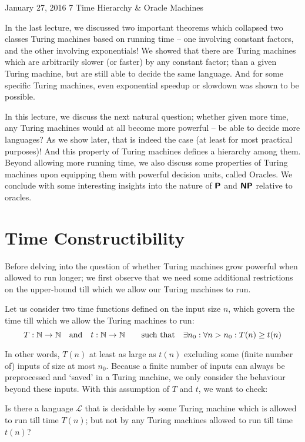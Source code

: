 \documentclass[usletter]{article}
\newcommand{\namedset}[1]
           {\ensuremath{\mathbb{#1}}}
\newcommand{\collection}[1]
           {\ensuremath{\mathcal{#1}}}
\newcommand{\family}[1]
           {\ensuremath{\textnormal{\textsf{\textbf{#1}}}}}
\newcommand{\term}[1]{\textsf{#1}}
\begin{document}
 {January 27, 2016}
            {7}
            {Time Hierarchy \& Oracle Machines}

\noindent
In the last lecture, we discussed two important theorems which
collapsed two classes Turing machines based on running time -- one involving
constant factors, and the other involving exponentials! We
showed that there are Turing machines which are arbitrarily
slower (or faster) by any constant factor; than a given Turing
machine, but are still able to decide the same language. And
for some specific Turing machines, even exponential speedup or
slowdown was shown to be possible.

In this lecture, we discuss the next natural question; whether
given more time, any Turing machines would at all become more
powerful -- be able to decide more languages? As we show later,
that is indeed the case (at least for most practical purposes)!
And this property of Turing machines defines a hierarchy among
them. Beyond allowing more running time, we also discuss some
properties of Turing machines upon equipping them with powerful
decision units, called \term{Oracles}. We conclude with some
interesting insights into the nature of \family{P} and \family{NP}
relative to oracles.

\section{Time Constructibility}

Before delving into the question of whether Turing machines grow powerful when allowed to run longer; we first observe that we need some additional restrictions on the upper-bound till which we allow our Turing machines to run.

Let us consider two time functions defined on the input size $n$, which govern the time till which we allow the Turing machines to run:
$$ T: \namedset{N} \to \namedset{N} \quad\textnormal{and}\quad
   t: \namedset{N} \to \namedset{N} \qquad\textnormal{such that}\quad
   \exists n_0: \forall n > n_0: T(n) \geq t(n)$$

\noindent
In other words, $T(n)$ at least as large as $t(n)$ excluding some (finite number of) inputs of size at most $n_0$. Because a finite number of inputs
can always be preprocessed and `saved' in a Turing machine, we only consider the behaviour beyond these inputs. With this assumption of $T$ and $t$, we want to check:

\begin{center}
Is there a language \collection{L} that is decidable by some Turing machine which is allowed to run till time $T(n)$; but not by any Turing machines allowed to run till time $t(n)$?
\end{center}
\end{document}

